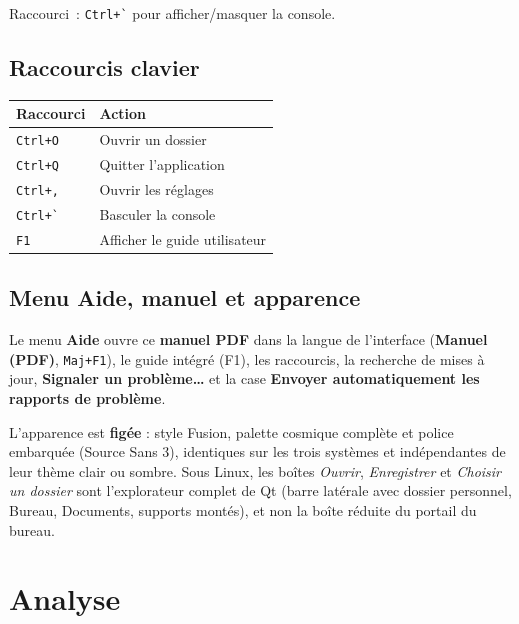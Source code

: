 \documentclass[a4paper,11pt]{article}
\newcommand{\menu}[1]{\textsf{\textbf{\textcolor{sky}{#1}}}}
\begin{document}
Raccourci~: \texttt{Ctrl+\`{}} pour afficher/masquer la console.

\subsection{Raccourcis clavier}

\begin{center}
\begin{tabularx}{0.7\textwidth}{l X}
\toprule
\textbf{Raccourci} & \textbf{Action} \\
\midrule
\texttt{Ctrl+O} & Ouvrir un dossier \\
\texttt{Ctrl+Q} & Quitter l'application \\
\texttt{Ctrl+,} & Ouvrir les r\'{e}glages \\
\texttt{Ctrl+\`{}} & Basculer la console \\
\texttt{F1} & Afficher le guide utilisateur \\
\bottomrule
\end{tabularx}
\end{center}


\subsection{Menu Aide, manuel et apparence}

Le menu \menu{Aide} ouvre ce \textbf{manuel PDF} dans la langue de
l'interface (\menu{Manuel (PDF)}, \texttt{Maj+F1}), le guide intégré (F1), les
raccourcis, la recherche de mises à jour, \menu{Signaler un problème\dots} et la
case \menu{Envoyer automatiquement les rapports de problème}.

L'apparence est \textbf{figée} : style Fusion, palette cosmique complète et
police embarquée (Source Sans 3), identiques sur les trois systèmes et
indépendantes de leur thème clair ou sombre. Sous Linux, les boîtes
\emph{Ouvrir}, \emph{Enregistrer} et \emph{Choisir un dossier} sont
l'explorateur complet de Qt (barre latérale avec dossier personnel, Bureau,
Documents, supports montés), et non la boîte réduite du portail du bureau.

\section{Analyse}
\label{sec:analyse}
\end{document}
